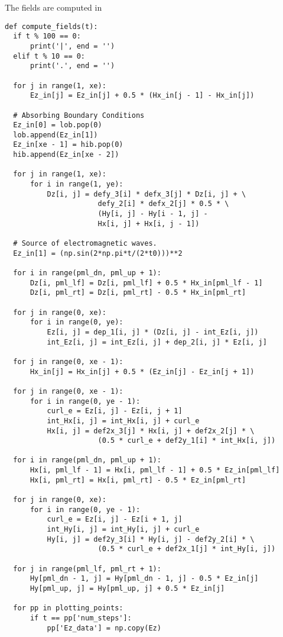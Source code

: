 \documentclass[11pt]{article}
\numberwithin{equation}{section}
\begin{document}
The fields are computed in
\begin{verbatim}
def compute_fields(t): 
  if t % 100 == 0:
      print('|', end = '')
  elif t % 10 == 0:
      print('.', end = '')
      
  for j in range(1, xe):
      Ez_in[j] = Ez_in[j] + 0.5 * (Hx_in[j - 1] - Hx_in[j])
              
  # Absorbing Boundary Conditions
  Ez_in[0] = lob.pop(0)
  lob.append(Ez_in[1])  
  Ez_in[xe - 1] = hib.pop(0)
  hib.append(Ez_in[xe - 2])
    
  for j in range(1, xe):
      for i in range(1, ye):
          Dz[i, j] = defy_3[i] * defx_3[j] * Dz[i, j] + \
                      defy_2[i] * defx_2[j] * 0.5 * \
                      (Hy[i, j] - Hy[i - 1, j] -
                      Hx[i, j] + Hx[i, j - 1])

  # Source of electromagnetic waves.
  Ez_in[1] = (np.sin(2*np.pi*t/(2*t0)))**2
  
  for i in range(pml_dn, pml_up + 1):
      Dz[i, pml_lf] = Dz[i, pml_lf] + 0.5 * Hx_in[pml_lf - 1]
      Dz[i, pml_rt] = Dz[i, pml_rt] - 0.5 * Hx_in[pml_rt]
      
  for j in range(0, xe):
      for i in range(0, ye):
          Ez[i, j] = dep_1[i, j] * (Dz[i, j] - int_Ez[i, j])
          int_Ez[i, j] = int_Ez[i, j] + dep_2[i, j] * Ez[i, j]
                  
  for j in range(0, xe - 1):
      Hx_in[j] = Hx_in[j] + 0.5 * (Ez_in[j] - Ez_in[j + 1])
      
  for j in range(0, xe - 1):
      for i in range(0, ye - 1):
          curl_e = Ez[i, j] - Ez[i, j + 1]
          int_Hx[i, j] = int_Hx[i, j] + curl_e
          Hx[i, j] = def2x_3[j] * Hx[i, j] + def2x_2[j] * \
                      (0.5 * curl_e + def2y_1[i] * int_Hx[i, j])
              
  for i in range(pml_dn, pml_up + 1):
      Hx[i, pml_lf - 1] = Hx[i, pml_lf - 1] + 0.5 * Ez_in[pml_lf]
      Hx[i, pml_rt] = Hx[i, pml_rt] - 0.5 * Ez_in[pml_rt]
      
  for j in range(0, xe):
      for i in range(0, ye - 1):
          curl_e = Ez[i, j] - Ez[i + 1, j]
          int_Hy[i, j] = int_Hy[i, j] + curl_e
          Hy[i, j] = def2y_3[i] * Hy[i, j] - def2y_2[i] * \
                      (0.5 * curl_e + def2x_1[j] * int_Hy[i, j])
  
  for j in range(pml_lf, pml_rt + 1):
      Hy[pml_dn - 1, j] = Hy[pml_dn - 1, j] - 0.5 * Ez_in[j]
      Hy[pml_up, j] = Hy[pml_up, j] + 0.5 * Ez_in[j]

  for pp in plotting_points:
      if t == pp['num_steps']:
          pp['Ez_data'] = np.copy(Ez)
\end{verbatim}
\end{document}
